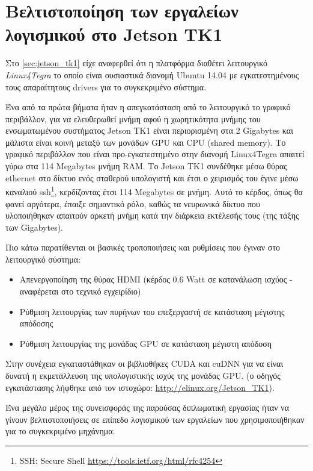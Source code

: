 \section{Βελτιστοποίηση των εργαλείων λογισμικού στο Jetson TK1}
\label{sec:implementations_jetson}

Στο \autoref{sec:jetson_tk1} είχε αναφερθεί ότι η πλατφόρμα διαθέτει
λειτουργικό \emph{Linux4Tegra} το οποίο είναι ουσιαστικά διανομή Ubuntu 14.04
με εγκατεστημένους τους απαραίτητους drivers για το συγκεκριμένο σύστημα.

Ένα από τα πρώτα βήματα ήταν η απεγκατάσταση από το λειτουργικό το
γραφικό περιβάλλον, για να ελευθερωθεί μνήμη αφού η χωρητικότητα μνήμης
του ενσωματωμένου συστήματος Jetson TK1 είναι περιορισμένη στα 2 Gigabytes
και μάλιστα είναι κοινή μεταξύ των μονάδων GPU και CPU (shared memory).
Το γραφικό περιβάλλον
που είναι προ-εγκατεστημένο στην διανομή Linux4Tegra απαιτεί γύρω στα 114 Megabytes μνήμη RAM.
Το Jetson TK1 συνδέθηκε
μέσω θύρας ethernet στο δίκτυο ενός σταθερού υπολογιστή και έτσι ο χειρισμός
του έγινε μέσω καναλιού ssh\footnote{SSH: Secure Shell \href{https://tools.ietf.org/html/rfc4254}{{https://tools.ietf.org/html/rfc4254}}},
κερδίζοντας έτσι 114 Megabytes σε μνήμη. Αυτό το κέρδος, όπως θα φανεί
αργότερα, έπαιξε σημαντικό ρόλο, καθώς τα νευρωνικά δίκτυο που υλοποιήθηκαν
απαιτούν αρκετή μνήμη κατά την διάρκεια εκτέλεσής τους (της τάξης των Gigabytes).

Πιο κάτω παρατίθενται οι βασικές τροποποιήσεις και ρυθμίσεις που έγιναν στο λειτουργικό σύστημα:
\begin{itemize}
  \item{Απενεργοποίηση της θύρας HDMI (κέρδος 0.6 Watt
    σε κατανάλωση ισχύος - αναφέρεται στο τεχνικό εγχειρίδιο)}
  \item{Ρύθμιση λειτουργίας των πυρήνων του επεξεργαστή σε κατάσταση μέγιστης απόδοσης}
  \item{Ρύθμιση λειτουργίας της μονάδας GPU σε κατάσταση μέγιστη απόδοση}
\end{itemize}

Στην συνέχεια εγκαταστάθηκαν οι βιβλιοθήκες CUDA και cuDNN για να είναι δυνατή
η εκμετάλλευση της υπολογιστικής ισχύς της μονάδας GPU. (ο οδηγός εγκατάστασης λήφθηκε από τον ιστοχώρο: \url{http://elinux.org/Jetson_TK1}).

Ένα μεγάλο μέρος της συνεισφοράς της παρούσας διπλωματική εργασίας
ήταν να γίνουν βελτιστοποιήσεις σε επίπεδο λογισμικού των εργαλείων που χρησιμοποιήθηκαν
για το συγκεκριμένο μηχάνημα.

